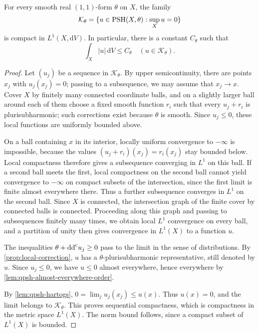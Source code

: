 \begin{theorem}\label{thm:normalized-compactness}
For every smooth real $(1,1)$-form $\theta$ on $X$, the family
\[
 \mathcal K_\theta=\{u\in\mathrm{PSH}(X,\theta):\sup_Xu=0\}
\]
is compact in $L^1(X,\mathrm{d}V)$. In particular, there is a constant $C_\theta$ such that
\[
 \int_X|u|\,\mathrm{d}V\leq C_\theta\quad(u\in\mathcal K_\theta).
\]
\end{theorem}
\begin{proof}
Let $(u_j)$ be a sequence in $\mathcal K_\theta$. By upper semicontinuity, there are points $x_j$ with $u_j(x_j)=0$; passing to a subsequence, we may assume that $x_j\to x$. Cover $X$ by finitely many connected coordinate balls, and on a slightly larger ball around each of them choose a fixed smooth function $r_i$ such that every $u_j+r_i$ is plurisubharmonic; such corrections exist because $\theta$ is smooth. Since $u_j\leq0$, these local functions are uniformly bounded above.

On a ball containing $x$ in its interior, locally uniform convergence to $-\infty$ is impossible, because the values $(u_j+r_i)(x_j)=r_i(x_j)$ stay bounded below. Local compactness therefore gives a subsequence converging in $L^1$ on this ball. If a second ball meets the first, local compactness on the second ball cannot yield convergence to $-\infty$ on compact subsets of the intersection, since the first limit is finite almost everywhere there. Thus a further subsequence converges in $L^1$ on the second ball. Since $X$ is connected, the intersection graph of the finite cover by connected balls is connected. Proceeding along this graph and passing to subsequences finitely many times, we obtain local $L^1$ convergence on every ball, and a partition of unity then gives convergence in $L^1(X)$ to a function $u$.

The inequalities $\theta+\mathrm{dd}^{\mathrm{c}} u_j\geq0$ pass to the limit in the sense of distributions. By \cref{prop:local-correction}, $u$ has a $\theta$-plurisubharmonic representative, still denoted by $u$. Since $u_j\leq0$, we have $u\leq0$ almost everywhere, hence everywhere by \cref{lem:qpsh-almost-everywhere-order}.

By \cref{lem:qpsh-hartogs}, $0=\lim_j u_j(x_j)\leq u(x)$. Thus $u(x)=0$, and the limit belongs to $\mathcal K_\theta$. This proves sequential compactness, which is compactness in the metric space $L^1(X)$. The norm bound follows, since a compact subset of $L^1(X)$ is bounded.
\end{proof}

